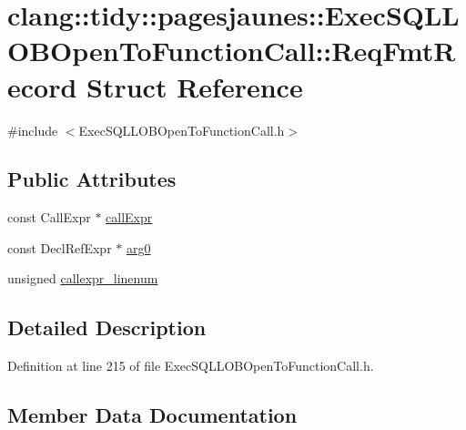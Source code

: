 \hypertarget{structclang_1_1tidy_1_1pagesjaunes_1_1_exec_s_q_l_l_o_b_open_to_function_call_1_1_req_fmt_record}{}\section{clang\+:\+:tidy\+:\+:pagesjaunes\+:\+:Exec\+S\+Q\+L\+L\+O\+B\+Open\+To\+Function\+Call\+:\+:Req\+Fmt\+Record Struct Reference}
\label{structclang_1_1tidy_1_1pagesjaunes_1_1_exec_s_q_l_l_o_b_open_to_function_call_1_1_req_fmt_record}


{\ttfamily \#include $<$Exec\+S\+Q\+L\+L\+O\+B\+Open\+To\+Function\+Call.\+h$>$}

\subsection*{Public Attributes}
\begin{DoxyCompactItemize}
\item 
const Call\+Expr $\ast$ \hyperlink{structclang_1_1tidy_1_1pagesjaunes_1_1_exec_s_q_l_l_o_b_open_to_function_call_1_1_req_fmt_record_a71af18259e34d2b46af4819a52fba5bd}{call\+Expr}
\item 
const Decl\+Ref\+Expr $\ast$ \hyperlink{structclang_1_1tidy_1_1pagesjaunes_1_1_exec_s_q_l_l_o_b_open_to_function_call_1_1_req_fmt_record_a91c41faf16d53de6a2291bd135495ce0}{arg0}
\item 
unsigned \hyperlink{structclang_1_1tidy_1_1pagesjaunes_1_1_exec_s_q_l_l_o_b_open_to_function_call_1_1_req_fmt_record_a94a7e6c7554dcca2bd90f59e4d1b5961}{callexpr\+\_\+linenum}
\end{DoxyCompactItemize}


\subsection{Detailed Description}


Definition at line 215 of file Exec\+S\+Q\+L\+L\+O\+B\+Open\+To\+Function\+Call.\+h.



\subsection{Member Data Documentation}
\mbox{\label{structclang_1_1tidy_1_1pagesjaunes_1_1_exec_s_q_l_l_o_b_open_to_function_call_1_1_req_fmt_record_a91c41faf16d53de6a2291bd135495ce0}} 
